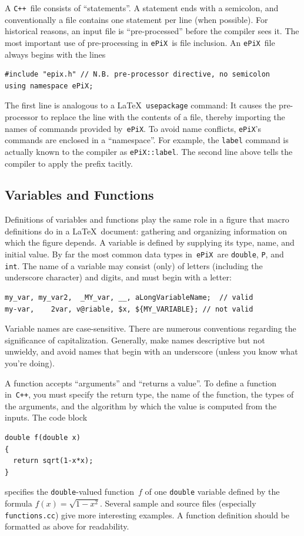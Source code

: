 \documentclass[12pt]{report}
\newcommand{\code}[1]{\texttt{#1}}
\newcommand{\filename}[1]{\texttt{#1}}
\newcommand{\ePiX}{\code{ePiX}}
\newcommand{\CXX}{\code{C++}}
\begin{document}
A \CXX\ file consists of ``statements''. A statement ends with a
semicolon, and conventionally a file contains one statement per line
(when possible). For historical reasons, an input file is
``pre-processed'' before the compiler sees it. The most important use
of pre-processing in \ePiX\ is file inclusion.  An \ePiX\ file always
begins with the lines
\begin{verbatim}
#include "epix.h" // N.B. pre-processor directive, no semicolon
using namespace ePiX;
\end{verbatim}
The first line is analogous to a \LaTeX\ \code{usepackage} command: It
causes the pre-processor to replace the line with the contents of a
file, thereby importing the names of commands provided by~\ePiX.  To
avoid name conflicts, \ePiX's commands are enclosed in a
``namespace''. For example, the \code{label} command is actually known
to the compiler as \code{ePiX::label}. The second line above tells the
compiler to apply the prefix tacitly.

\subsection*{Variables and Functions}

Definitions of variables and functions play the same role in a figure
that macro definitions do in a \LaTeX\ document: gathering and
organizing information on which the figure depends. A variable is
defined by supplying its type, name, and initial value. By far the
most common data types in~\ePiX\ are \code{double}, \code{P}, and
\code{int}. The name of a variable may consist (only) of letters
(including the underscore character) and digits, and must begin with a
letter:
\begin{verbatim}
my_var, my_var2,  _MY_var, __, aLongVariableName;  // valid
my-var,    2var, v@riable, $x, ${MY_VARIABLE}; // not valid
\end{verbatim}
Variable names are case-sensitive. There are numerous conventions
regarding the significance of capitalization. Generally, make names
descriptive but not unwieldy, and avoid names that begin with an
underscore (unless you know what you're doing).

A function accepts ``arguments'' and ``returns a value''. To define a
function in~\CXX, you must specify the return type, the name of the
function, the types of the arguments, and the algorithm by which the
value is computed from the inputs. The code block
\begin{footnotesize}
\begin{verbatim}
double f(double x) 
{ 
  return sqrt(1-x*x); 
}
\end{verbatim}
\end{footnotesize}
specifies the \code{double}-valued function~$f$ of one \code{double}
variable defined by the formula $f(x)=\sqrt{1-x^2}$. Several sample
and source files (especially \filename{functions.cc}) give more
interesting examples. A function definition should be formatted as
above for readability.
\end{document}
